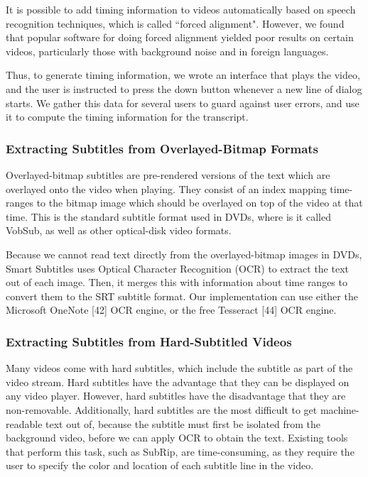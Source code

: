 \documentclass{sigchi}
\begin{document}
It is possible to add timing information to videos automatically based on speech recognition techniques, which is called ``forced alignment".
However, we found that popular software for doing forced alignment
yielded poor results on certain videos, particularly those with background
noise and in foreign languages.

Thus, to generate timing information,
we wrote an interface that plays the video,
and the user is instructed to press the down button whenever a new
line of dialog starts.
We gather this data for several users to guard against user errors,
and use it to compute the timing information for the transcript.

\subsubsection{Extracting Subtitles from Overlayed-Bitmap Formats}

Overlayed-bitmap subtitles are pre-rendered versions of the text which are overlayed onto the video when playing. They consist of an index mapping time-ranges to the bitmap image which should be overlayed on top of the video at that time. This is the standard subtitle format used in DVDs, where is it called VobSub, as well as other optical-disk video formats.

Because we cannot read text directly from the overlayed-bitmap images in DVDs, Smart Subtitles uses Optical Character Recognition (OCR) to extract the text out of each image. Then, it merges this with information about time ranges to convert them to the SRT subtitle format. Our implementation can use either the Microsoft OneNote [42] OCR engine, or the free Tesseract [44] OCR engine.

\subsubsection{Extracting Subtitles from Hard-Subtitled Videos}

Many videos come with hard subtitles, which include the subtitle as part of the video stream. Hard subtitles have the advantage that they can be displayed on any video player. However, hard subtitles have the disadvantage that they are non-removable. Additionally, hard subtitles are the most difficult to get machine-readable text out of, because the subtitle must first be isolated from the background video, before we can apply OCR to obtain the text. Existing tools that perform this task, such as SubRip, are time-consuming, as they require the user to specify the color and location of each subtitle line in the video.
\end{document}
